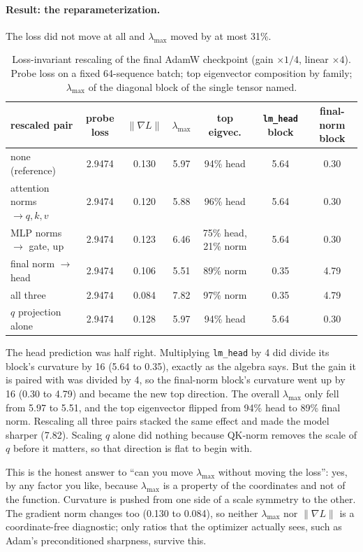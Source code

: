 \documentclass[10pt,letterpaper]{article}
\newcommand{\lmax}{\lambda_{\max}}
\begin{document}
\paragraph{Result: the reparameterization.} The loss did not move at all and $\lmax$ moved by at most 31\%.

\begin{table}[H]\centering\small
\caption{Loss-invariant rescaling of the final AdamW checkpoint (gain $\times 1/4$, linear $\times 4$). Probe loss on a fixed 64-sequence batch; top eigenvector composition by family; $\lmax$ of the diagonal block of the single tensor named.}
\begin{tabular}{lcccccc}\toprule
rescaled pair & probe loss & $\|\nabla L\|$ & $\lmax$ & top eigvec. & \texttt{lm\_head} block & final-norm block\\\midrule
none (reference) & 2.9474 & 0.130 & 5.97 & 94\% head & 5.64 & 0.30\\
attention norms $\to q,k,v$ & 2.9474 & 0.120 & 5.88 & 96\% head & 5.64 & 0.30\\
MLP norms $\to$ gate, up & 2.9474 & 0.123 & 6.46 & 75\% head, 21\% norm & 5.64 & 0.30\\
final norm $\to$ head & 2.9474 & 0.106 & 5.51 & 89\% norm & 0.35 & 4.79\\
all three & 2.9474 & 0.084 & 7.82 & 97\% norm & 0.35 & 4.79\\
$q$ projection alone & 2.9474 & 0.128 & 5.97 & 94\% head & 5.64 & 0.30\\
\bottomrule\end{tabular}\end{table}

The head prediction was half right. Multiplying \texttt{lm\_head} by 4 did divide its block's curvature by 16 (5.64 to 0.35), exactly as the algebra says. But the gain it is paired with was divided by 4, so the final-norm block's curvature went up by 16 (0.30 to 4.79) and became the new top direction. The overall $\lmax$ only fell from 5.97 to 5.51, and the top eigenvector flipped from 94\% head to 89\% final norm. Rescaling all three pairs stacked the same effect and made the model sharper (7.82). Scaling $q$ alone did nothing because QK-norm removes the scale of $q$ before it matters, so that direction is flat to begin with.

This is the honest answer to ``can you move $\lmax$ without moving the loss'': yes, by any factor you like, because $\lmax$ is a property of the coordinates and not of the function. Curvature is pushed from one side of a scale symmetry to the other. The gradient norm changes too (0.130 to 0.084), so neither $\lmax$ nor $\|\nabla L\|$ is a coordinate-free diagnostic; only ratios that the optimizer actually sees, such as Adam's preconditioned sharpness, survive this.
\end{document}
